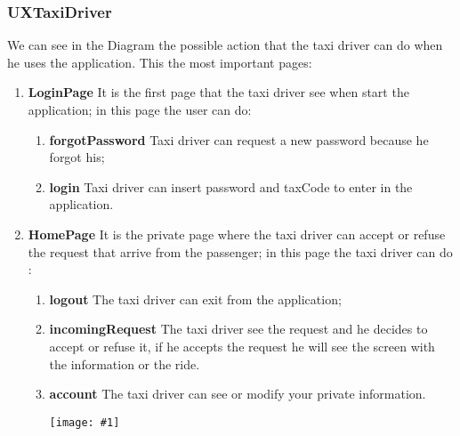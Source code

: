 \documentclass[11pt, a4paper,titlepage]{article}
\newcommand{\image}[1]{
	\begin{center}
		\noindent \texttt{[image: \#1]}
	\end{center}
	}
\begin{document}
	\subsubsection{UXTaxiDriver}
	We can see in the Diagram the possible action that the taxi driver can do when he uses the application.
	This the most important pages:
	\begin{enumerate}
		\item \textbf{LoginPage} It is the first page that the taxi driver see when start the
		application; in this page the user can do:
		\begin{enumerate}
			
			\item \textbf{forgotPassword} Taxi driver can request a new password because he
			forgot his;
			\item \textbf{login} Taxi driver can insert password and taxCode to enter in the
			application.
		\end{enumerate}
		\item \textbf{HomePage} It is the private page where the taxi driver can accept or refuse the request that arrive from the passenger; in this page the taxi driver can do :
		\begin{enumerate}
			\item \textbf{logout} The taxi driver can exit from the application;
			\item \textbf{incomingRequest} The taxi driver see the request and he decides to accept
			or refuse it, if he accepts the request he will see the screen with the information or the ride.
			\item \textbf{account} The taxi driver can see or modify your private information.
			\image{ux_taxidriver.png}
		\end{enumerate}
	\end{enumerate}
\end{document}

